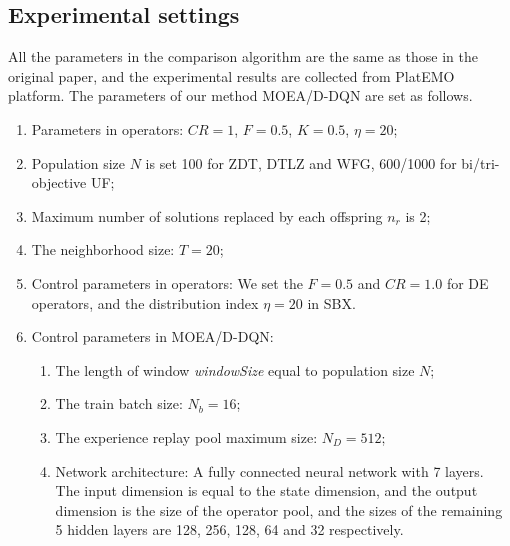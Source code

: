\documentclass[journal]{IEEEtran}
\begin{document}
\subsection{Experimental settings}
All the parameters in the comparison algorithm are the same as those in the original paper, and the experimental results are collected from PlatEMO \cite{PlatEMO} platform.
The parameters of our method MOEA/D-DQN are set as follows.
\begin{enumerate}
    \item Parameters in operators: $CR=1$, $F=0.5$, $K=0.5$, $\eta=20$;
    \item Population size $N$ is set 100 for ZDT, DTLZ and WFG, 600/1000 for bi/tri-objective UF;
    \item Maximum number of solutions replaced by each offspring $n_r$ is 2;
    \item The neighborhood size: $T=20$;
    \item Control parameters in operators: We set the $F=0.5$ and $CR=1.0$ for DE operators, and the distribution index $\eta=20$ in SBX.
    \item Control parameters in MOEA/D-DQN:
          \begin{enumerate}
              \item The length of window \textit{windowSize} equal to population size $N$;
              \item The train batch size: $N_b = 16$;
              \item The experience replay pool maximum size: $N_D=512$;
              \item Network architecture: A fully connected neural network with 7 layers. The input dimension is equal to the state dimension, and the output dimension is the size of the operator pool, and the sizes of the remaining 5 hidden layers are 128, 256, 128, 64 and 32 respectively.
          \end{enumerate}
\end{enumerate}

\end{document}
